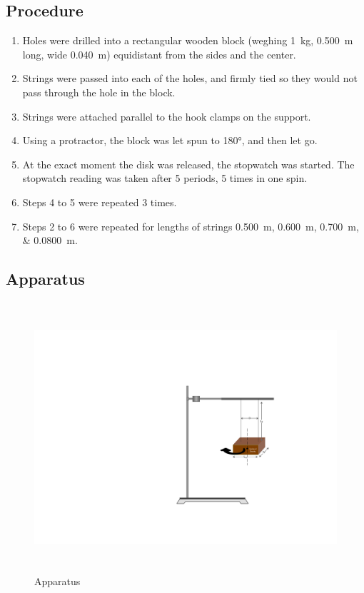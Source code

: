 \documentclass[a4paper,12pt]{article}
\theoremstyle{definition}
\begin{document}
\subsection{Procedure}


\begin{enumerate}
	\item Holes were drilled into a rectangular wooden block (weghing \SI{1}{kg}, \SI{0.500}{m} long, wide \SI{0.040}{m}) equidistant from the sides and the center. 
	\item Strings were passed into each of the holes, and firmly tied so they would not pass through the hole in the block.
	\item Strings were attached parallel to the hook clamps on the support.
	\item Using a protractor, the block was let spun to \ang{180}, and then let go.
	\item At the exact moment the disk was released, the stopwatch was started. The stopwatch reading was taken after 5 periods, 5 times in one spin.
	\item Steps 4 to 5 were repeated 3 times. 
	\item Steps 2 to 6 were repeated for lengths of strings \SIlist{0.500;0.600;0.700;0.0800}{\meter}.
\end{enumerate}


\subsection{Apparatus}
\begin{figure}[h]
    \centering
    \includegraphics[width=\textwidth,height=10cm,keepaspectratio]{setup.pdf}
    \caption{Apparatus}
    \label{fig:apparatus}
\end{figure}
\end{document}
